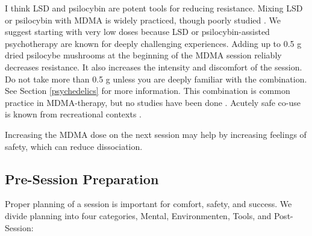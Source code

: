 \documentclass[12pt,letterpaper]{article}
\begin{document}
I think LSD and psilocybin are potent tools for reducing resistance.  Mixing LSD or psilocybin with MDMA is widely practiced, though poorly studied \cite{zeifmanCo-use}. We suggest starting with very low doses because LSD or psilocybin-assisted psychotherapy are known for deeply challenging experiences. Adding up to 0.5 g dried psilocybe mushrooms at the beginning of the MDMA session reliably decreases resistance. It also increases the intensity and discomfort of the session. Do not take more than 0.5 g unless you are deeply familiar with the combination. See Section \ref{psychedelics} for more information. This combination is common practice in MDMA-therapy, but no studies have been done \cite{colemanPsychedelicPsychotherapy}. Acutely safe co-use is known from recreational contexts \cite{zeifmanCo-use}. 

Increasing the MDMA dose on the next session may help by increasing feelings of safety, which can reduce dissociation.
\subsection{Pre-Session Preparation}
\label{prep}
Proper planning of a session is important for comfort, safety, and success. We divide planning into four categories, Mental, Environmenten, Tools, and Post-Session:

\vspace{\baselineskip}
\end{document}
